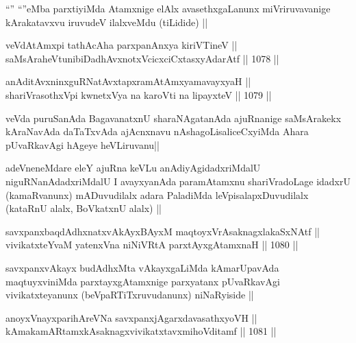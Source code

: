 \begin{artha}
``\stext'' ``\stext''eMba parxtiyiMda Atamxnige elAlx avasethxgaLanunx miVriruvavanige kArakatavxvu iruvudeV ilalxveMdu (tiLidide) ||
\end{artha}


\begin{shl}
veVdAtAmx\s pi tathAcA\s \s ha parxpanAnxya kiriVTineV || \\
saMsAraheVtunibiDadhAvxnotxVcicxciCxtasxyA\s \s darAtf ||  1078 || 
\end{shl}
				
\begin{shl}
anAditAvxninxguRNatAvxtapxramAtAmx\s yamavayxyaH || \\
shariVrasothxV\s pi kwnetxVya na karoVti na lipayxteV ||  1079 ||  
\end{shl}

\begin{artha}
veVda puruSanAda BagavanatxnU sharaNAgatanAda ajuRnanige saMsArakekx kAraNavAda daTaTxvAda ajAcnxnavu nAshagoLisaliceCxyiMda Ahara pUvaRkavAgi hAgeye heVLiruvanu||
\end{artha}

\begin{artha}
adeVneneMdare eleY ajuRna keVLu anAdiyAgidadxriMdalU niguRNanAdadxriMdalU I avayxyanAda paramAtamxnu shariVradoLage idadxrU (kamaRvanunx) mADuvudilalx adara PaladiMda leVpisalapxDuvudilalx (kataRnU alalx, BoVkatxnU alalx) ||
\end{artha}


\begin{shl}
savxpanxbaqdAdhxnatxvAkAyxBAyxM maqtoyxVrAsaknagxlakaSxNAtf || \\
vivikatxteYvaM yatenxVna niNiVRtA parxtAyxgAtamxnaH ||  1080 ||  
\end{shl}

\begin{artha}
savxpanxvAkayx budAdhxMta vAkayxgaLiMda kAmarUpavAda maqtuyxviniMda parxtayxgAtamxnige parxyatanx pUvaRkavAgi vivikatxteyanunx (beVpaRTiTxruvudanunx) niNaRyiside ||
\end{artha}


\begin{shl}
anoyxVnayxparihAreVNa savxpanxjAgarxdavasathxyoVH || \\
kAmakamARtamxkAsaknagxvivikatxtavxmihoVditamf ||  1081 ||  
\end{shl}

